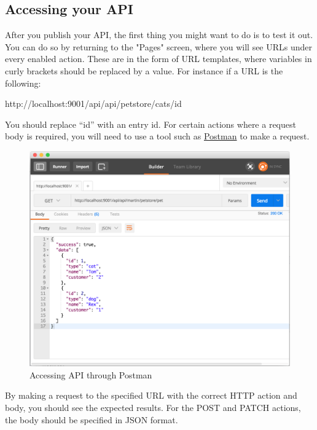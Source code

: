 \subsection{Accessing your API}

After you publish your API, the first thing you might want to do is to test it out. You can do so by returning to the "Pages" screen, where you will see URLs under every enabled action. These are in the form of URL templates, where variables in curly brackets should be replaced by a value. For instance if a URL is the following:

http://localhost:9001/api/api/petstore/cats/{id}

You should replace ``{id}'' with an entry id. For certain actions where a request body is required, you will need to use a tool such as \href{https://www.getpostman.com/}{Postman} to make a request.

\begin{figure}
\label{rest}
\centerline{\includegraphics[scale=0.4]{screenshots/api.png}}
\caption{Accessing API through Postman}
\end{figure}
By making a request to the specified URL with the correct HTTP action and body, you should see the expected results. For the POST and PATCH actions, the body should be specified in JSON format.
